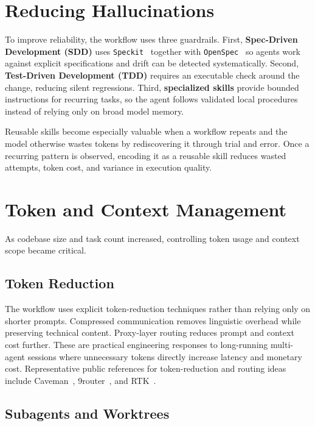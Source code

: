 \section{Reducing Hallucinations}\label{reducing-hallucinations}

To improve reliability, the workflow uses three guardrails. First, \textbf{Spec-Driven Development (SDD)} uses \texttt{Speckit}~\cite{speckit} together with \texttt{OpenSpec}~\cite{openspec} so agents work against explicit specifications and drift can be detected systematically. Second, \textbf{Test-Driven Development (TDD)} requires an executable check around the change, reducing silent regressions. Third, \textbf{specialized skills} provide bounded instructions for recurring tasks, so the agent follows validated local procedures instead of relying only on broad model memory.

Reusable skills become especially valuable when a workflow repeats and the model otherwise wastes tokens by rediscovering it through trial and error. Once a recurring pattern is observed, encoding it as a reusable skill reduces wasted attempts, token cost, and variance in execution quality.

\section{Token and Context Management}\label{token-and-context-management}

As codebase size and task count increased, controlling token usage and context scope became critical.

\subsection{Token Reduction}\label{token-reduction}

The workflow uses explicit token-reduction techniques rather than relying only on shorter prompts. Compressed communication removes linguistic overhead while preserving technical content. Proxy-layer routing reduces prompt and context cost further. These are practical engineering responses to long-running multi-agent sessions where unnecessary tokens directly increase latency and monetary cost. Representative public references for token-reduction and routing ideas include Caveman~\cite{caveman}, 9router~\cite{router9}, and RTK~\cite{rtk}.

\subsection{Subagents and Worktrees}\label{subagents-and-worktrees}

